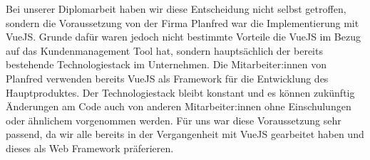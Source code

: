 Bei unserer Diplomarbeit haben wir diese Entscheidung nicht selbst getroffen, sondern die Voraussetzung von der Firma Planfred war die Implementierung mit VueJS. Grunde dafür waren jedoch nicht bestimmte Vorteile die VueJS im Bezug auf das Kundenmanagement Tool hat, sondern hauptsächlich der bereits bestehende Technologiestack im Unternehmen. 
Die Mitarbeiter:innen von Planfred verwenden bereits VueJS als Framework für die Entwicklung des Hauptproduktes.
Der Technologiestack bleibt konstant und es können zukünftig Änderungen am Code auch von anderen Mitarbeiter:innen ohne Einschulungen oder ähnlichem vorgenommen werden.
Für uns war diese Voraussetzung sehr passend, da wir alle bereits in der Vergangenheit mit VueJS gearbeitet haben und dieses als Web Framework präferieren.